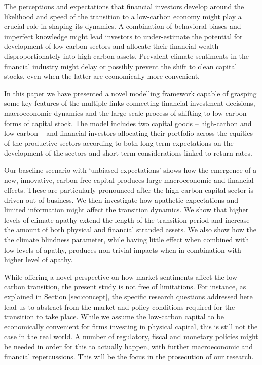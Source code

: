 \documentclass[authoryear]{article}
\begin{document}
The perceptions and expectations that financial investors develop around the likelihood and speed of the transition to a low-carbon economy might play a crucial role in shaping its dynamics. A combination of behavioral biases and imperfect knowledge might lead investors to under-estimate the potential for development of low-carbon sectors and allocate their financial wealth disproportionately into high-carbon assets. Prevalent climate sentiments in the financial industry might delay or possibly prevent the shift to clean capital stocks, even when the latter are economically more convenient. 

In this paper we have presented a novel modelling framework capable of grasping some key features of the multiple links connecting financial investment decisions, macroeconomic dynamics and the large-scale process of shifting to low-carbon forms of capital stock. The model includes two capital goods – high-carbon and low-carbon – and financial investors allocating their portfolio across the equities of the productive sectors according to both long-term expectations on the development of the sectors and short-term considerations linked to return rates. 

Our baseline scenario with `unbiased expectations' shows how the emergence of a new, innovative, carbon-free capital produces large macroeconomic and financial effects. These are particularly pronounced after the high-carbon capital sector is driven out of business. We then investigate how apathetic expectations and limited information might affect the transition dynamics. We show that higher levels of climate apathy extend the length of the transition period and increase the amount of both physical and financial stranded assets. We also show how the the climate blindness parameter, while having little effect when combined with low levels of apathy, produces non-trivial impacts when in combination with higher level of apathy.

While offering a novel perspective on how market sentiments affect the low-carbon transition, the present study is not free of limitations. For instance, as explained in Section \ref{sec:concept}, the specific research questions addressed here lead us to abstract from the market and policy conditions required for the transition to take place. While we assume the low-carbon capital to be economically convenient for firms investing in physical capital, this is still not the case in the real world. A number of regulatory, fiscal and monetary policies might be needed in order for this to actually happen, with further macroeconomic and financial repercussions. This will be the focus in the prosecution of our research.  
\end{document}
